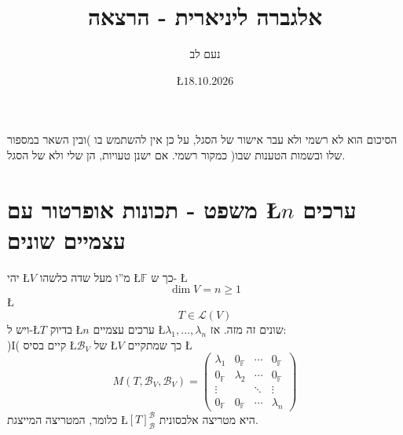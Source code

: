 \documentclass[english,hebrew]{article}
\begin{document}
\title{אלגברה ליניארית {\endL} - הרצאה {\endL}}
\author{נעם לב}
\date{\L{$18.10.2026$}}

\maketitle
\noindent{}
\begin{center}
הסיכום הוא לא רשמי ולא עבר אישור של הסגל, על כן אין להשתמש בו )ובין
השאר במספור שלו ובשמות הטענות שבו( כמקור רשמי. אם ישנן טעויות, הן
שלי ולא של הסגל.
\par\end{center}

\medskip{}

\tableofcontents{}

\newpage{}

\section{משפט - תכונות אופרטור עם \L{$n$} ערכים עצמיים שונים}

יהי \L{$V$} מ\textquotedblright ו מעל שדה כלשהו \L{$\mathbb{F}$}
כך ש- \L{%
\[
\dim V=n\geq1
\]
}%
\L{%
\[
T\in\mathcal{L}(V)
\]
}%
ויש ל-\L{$T$} בדיוק \L{$n$} ערכים עצמיים \L{$\lambda_{1},\dots,\lambda_{n}$}
שונים זה מזה. אז:\\

)I( קיים בסיס \L{$\mathcal{B}_{V}$} של \L{$V$} כך שמתקיים \L{%
\[
M(T,\mathcal{B}_{V},\mathcal{B}_{V})=\begin{pmatrix}\lambda_{1} & 0_{\mathbb{F}} & \cdots & 0_{\mathbb{F}}\\
0_{\mathbb{F}} & \lambda_{2} & \cdots & 0_{\mathbb{F}}\\
\vdots &  & \ddots & \vdots\\
0_{\mathbb{F}} & 0_{\mathbb{F}} & \cdots & \lambda_{n}
\end{pmatrix}
\]
}%
כלומר, המטריצה המייצגת \L{$\left[T\right]_{\mathcal{B}}^{\mathcal{B}}$}
היא מטריצה אלכסונית.
\end{document}
